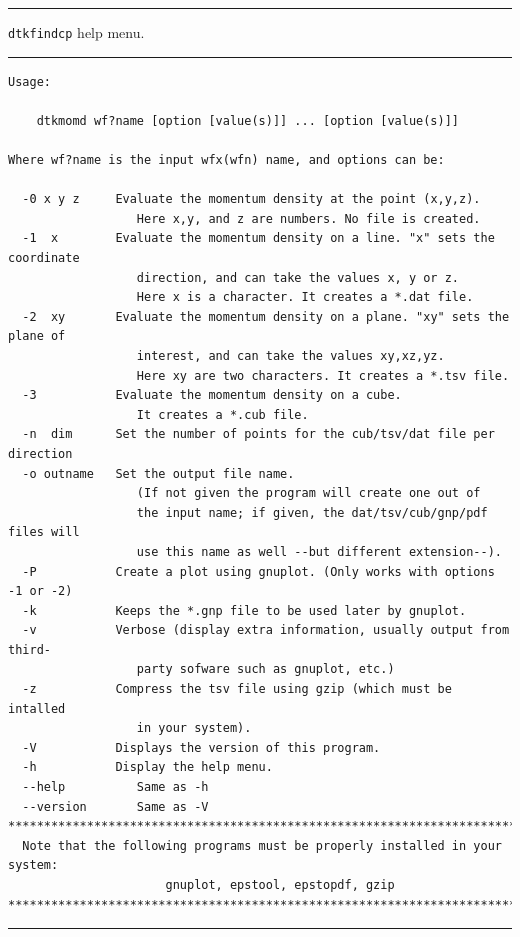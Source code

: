 \rule{\textwidth}{1pt}
{\center\texttt{dtkfindcp} help menu.\\}
\rule{\textwidth}{1pt}
\begin{footnotesize}
\begin{verbatim}
Usage:

	dtkmomd wf?name [option [value(s)]] ... [option [value(s)]]

Where wf?name is the input wfx(wfn) name, and options can be:

  -0 x y z     Evaluate the momentum density at the point (x,y,z).
                  Here x,y, and z are numbers. No file is created.
  -1  x        Evaluate the momentum density on a line. "x" sets the coordinate
                  direction, and can take the values x, y or z.
                  Here x is a character. It creates a *.dat file.
  -2  xy       Evaluate the momentum density on a plane. "xy" sets the plane of
                  interest, and can take the values xy,xz,yz.
                  Here xy are two characters. It creates a *.tsv file.
  -3           Evaluate the momentum density on a cube.
                  It creates a *.cub file.
  -n  dim      Set the number of points for the cub/tsv/dat file per direction
  -o outname   Set the output file name.
                  (If not given the program will create one out of
                  the input name; if given, the dat/tsv/cub/gnp/pdf files will
                  use this name as well --but different extension--).
  -P           Create a plot using gnuplot. (Only works with options -1 or -2)
  -k           Keeps the *.gnp file to be used later by gnuplot.
  -v           Verbose (display extra information, usually output from third-
                  party sofware such as gnuplot, etc.)
  -z           Compress the tsv file using gzip (which must be intalled
                  in your system).
  -V           Displays the version of this program.
  -h           Display the help menu.
  --help          Same as -h
  --version       Same as -V
********************************************************************************
  Note that the following programs must be properly installed in your system:
                      gnuplot, epstool, epstopdf, gzip
********************************************************************************
\end{verbatim}
\end{footnotesize}
\rule{\textwidth}{1pt}



